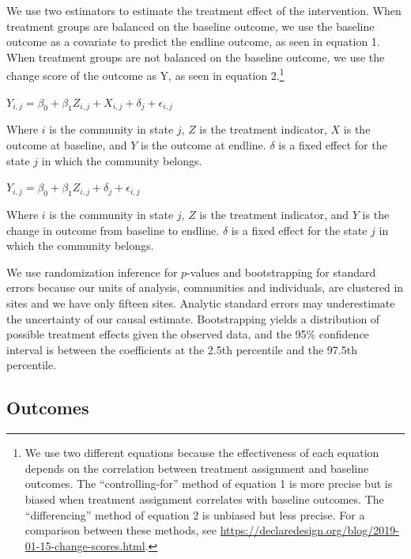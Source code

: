 \documentclass[11pt]{article}
\begin{document}
We use two estimators to estimate the treatment effect of the
intervention. When treatment groups are balanced on the baseline
outcome, we use the baseline outcome as a covariate to predict the
endline outcome, as seen in equation 1. When treatment groups are not
balanced on the baseline outcome, we use the change score of the outcome
as Y, as seen in equation 2.\footnote{We use two different equations
  because the effectiveness of each equation depends on the correlation
  between treatment assignment and baseline outcomes. The
  ``controlling-for'' method of equation 1 is more precise but is biased
  when treatment assignment correlates with baseline outcomes. The
  ``differencing'' method of equation 2 is unbiased but less precise.
  For a comparison between these methods, see
  \url{https://declaredesign.org/blog/2019-01-15-change-scores.html}.}

\medskip

\(Y_{i,j} = \beta_0 + \beta_1Z_{i,j} + X_{i,j} + \delta_j + \epsilon_{i,j}\)

\medskip

\noindent Where \(i\) is the community in state \(j\), \(Z\) is the
treatment indicator, \(X\) is the outcome at baseline, and \(Y\) is the
outcome at endline. \(\delta\) is a fixed effect for the state \(j\) in
which the community belongs.

\medskip

\(Y_{i,j} = \beta_0 + \beta_1Z_{i,j} + \delta_j + \epsilon_{i,j}\)

\medskip

\noindent Where \(i\) is the community in state \(j\), \(Z\) is the
treatment indicator, and \(Y\) is the change in outcome from baseline to
endline. \(\delta\) is a fixed effect for the state \(j\) in which the
community belongs.

We use randomization inference for \(p\)-values and bootstrapping for
standard errors because our units of analysis, communities and
individuals, are clustered in sites and we have only fifteen sites.
Analytic standard errors may underestimate the uncertainty of our causal
estimate. Bootstrapping yields a distribution of possible treatment
effects given the observed data, and the 95\% confidence interval is
between the coefficients at the 2.5th percentile and the 97.5th
percentile.

\hypertarget{outcomes}{%
\subsection{Outcomes}\label{outcomes}}
\end{document}
